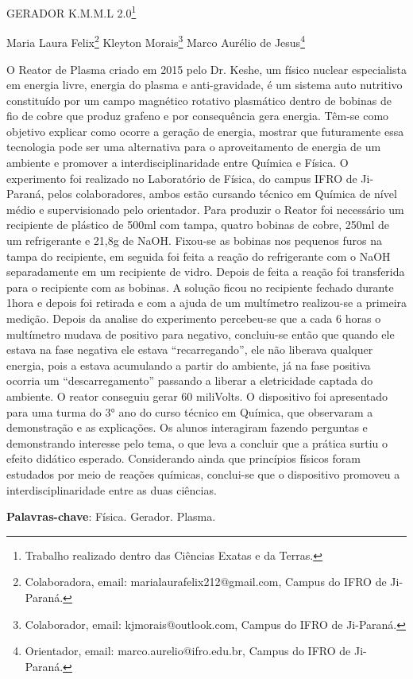 \documentclass[article,12pt,onesidea,4paper,english,brazil]{abntex2}
\begin{document}
	
	
	\frenchspacing 
	
	\begin{center}
		\LARGE GERADOR K.M.M.L 2.0\footnote{Trabalho realizado dentro das Ciências Exatas e da Terras.}
		
		\normalsize
		Maria Laura Felix\footnote{Colaboradora, email: marialaurafelix212@gmail.com, Campus do IFRO de Ji-Paraná.} 
		Kleyton Morais\footnote{Colaborador, email: kjmorais@outlook.com, Campus do IFRO de Ji-Paraná.} 
	Marco Aurélio de Jesus\footnote{Orientador, email: marco.aurelio@ifro.edu.br, Campus do IFRO de Ji-Paraná.} 
	\end{center}
	
	\noindent O Reator de Plasma criado em 2015 pelo Dr. Keshe, um físico nuclear especialista
	em energia livre, energia do plasma e anti-gravidade, é um sistema auto nutritivo
	constituído por um campo magnético rotativo plasmático dentro de bobinas de fio de
	cobre que produz grafeno e por consequência gera energia. Têm-se como objetivo
	explicar como ocorre a geração de energia, mostrar que futuramente essa tecnologia
	pode ser uma alternativa para o aproveitamento de energia de um ambiente e
	promover a interdisciplinaridade entre Química e Física. O experimento foi realizado
	no Laboratório de Física, do campus IFRO de Ji-Paraná, pelos colaboradores,
	ambos estão cursando técnico em Química de nível médio e supervisionado pelo
	orientador. Para produzir o Reator foi necessário um recipiente de plástico de 500ml
	com tampa, quatro bobinas de cobre, 250ml de um refrigerante e 21,8g de NaOH.
	Fixou-se as bobinas nos pequenos furos na tampa do recipiente, em seguida foi feita
	a reação do refrigerante com o NaOH separadamente em um recipiente de vidro.
	Depois de feita a reação foi transferida para o recipiente com as bobinas. A solução
	ficou no recipiente fechado durante 1hora e depois foi retirada e com a ajuda de um
	multímetro realizou-se a primeira medição. Depois da analise do experimento
	percebeu-se que a cada 6 horas o multímetro mudava de positivo para negativo,
	concluiu-se então que quando ele estava na fase negativa ele estava
	“recarregando”, ele não liberava qualquer energia, pois a estava acumulando a partir
	do ambiente, já na fase positiva ocorria um “descarregamento” passando a liberar a
	eletricidade captada do ambiente. O reator conseguiu gerar 60 miliVolts. O
	dispositivo foi apresentado para uma turma do 3° ano do curso técnico em Química,
	que observaram a demonstração e as explicações. Os alunos interagiram fazendo
	perguntas e demonstrando interesse pelo tema, o que leva a concluir que a prática
	surtiu o efeito didático esperado. Considerando ainda que princípios físicos foram
	estudados por meio de reações químicas, conclui-se que o dispositivo promoveu a
	interdisciplinaridade entre as duas ciências.
	
	\vspace{\onelineskip}
	
	\noindent
	\textbf{Palavras-chave}: Física. Gerador. Plasma.
	
\end{document}
